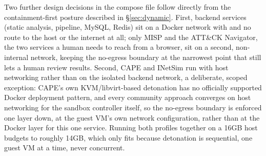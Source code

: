 Two further design decisions in the compose file follow directly from the
containment-first posture described in \S\ref{sec:dynamic}. First,
backend services (static analysis, pipeline, MySQL, Redis) sit on a
Docker network with  and no route to the host or
the internet at all; only MISP and the ATT\&CK Navigator, the two
services a human needs to reach from a browser, sit on a second,
non-internal network, keeping the no-egress boundary at the narrowest
point that still lets a human review results. Second, CAPE and INetSim
run with host networking rather than on the isolated backend network, a
deliberate, scoped exception: CAPE's own KVM/libvirt-based detonation
has no officially supported Docker deployment pattern, and every
community approach converges on host networking for the sandbox
controller itself, so the no-egress boundary is enforced one layer
down, at the guest VM's own network configuration, rather than at the
Docker layer for this one service. Running both profiles together on a
16GB host budgets to roughly 14GB, which only fits because detonation
is sequential, one guest VM at a time, never concurrent.
